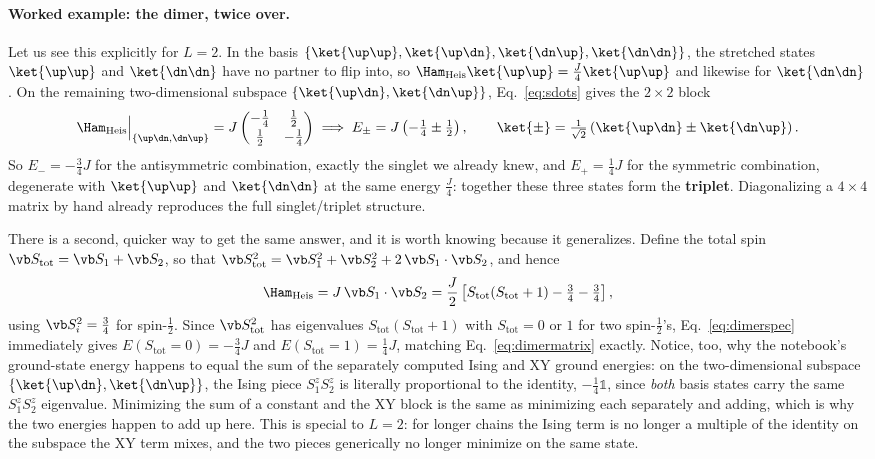\documentclass[all_sessions.tex]{subfiles}
\begin{document}
\paragraph{Worked example: the dimer, twice over.} Let us see this explicitly for $L=2$. In the basis
$\{\ket{\up\up},\ket{\up\dn},\ket{\dn\up},\ket{\dn\dn}\}$, the stretched states $\ket{\up\up}$ and
$\ket{\dn\dn}$ have no partner to flip into, so $\Ham_{\mathrm{Heis}}\ket{\up\up}=\tfrac{J}{4}\ket{\up\up}$
and likewise for $\ket{\dn\dn}$. On the remaining two-dimensional subspace $\{\ket{\up\dn},\ket{\dn\up}\}$,
Eq.~\eqref{eq:sdots} gives the $2\times2$ block
\begin{equation}
  \Ham_{\mathrm{Heis}}\Big|_{\{\up\dn,\dn\up\}} = J\begin{pmatrix} -\tfrac14 & \tfrac12 \\[2pt]
    \tfrac12 & -\tfrac14 \end{pmatrix}
  \;\Longrightarrow\;
  E_\pm = J\left(-\tfrac14\pm\tfrac12\right), \qquad
  \ket{\pm} = \tfrac{1}{\sqrt2}\left(\ket{\up\dn}\pm\ket{\dn\up}\right).
  \label{eq:dimermatrix}
\end{equation}
So $E_-=-\tfrac34 J$ for the antisymmetric combination, exactly the singlet we already knew, and
$E_+=\tfrac14 J$ for the symmetric combination, degenerate with $\ket{\up\up}$ and $\ket{\dn\dn}$ at the
same energy $\tfrac{J}{4}$: together these three states form the \textbf{triplet}. Diagonalizing a
$4\times4$ matrix by hand already reproduces the full singlet/triplet structure.

There is a second, quicker way to get the same answer, and it is worth knowing because it generalizes.
Define the total spin $\vb S_{\mathrm{tot}} = \vb S_1+\vb S_2$, so that
$\vb S_{\mathrm{tot}}^2 = \vb S_1^2+\vb S_2^2+2\,\vb S_1\cdot\vb S_2$, and hence
\begin{equation}
  \Ham_{\mathrm{Heis}} = J\,\vb S_1\cdot\vb S_2
    = \frac{J}{2}\left[S_{\mathrm{tot}}(S_{\mathrm{tot}}+1) - \tfrac34 - \tfrac34\right],
  \label{eq:dimerspec}
\end{equation}
using $\vb S_i^2=\tfrac34$ for spin-$\tfrac12$. Since $\vb S_{\mathrm{tot}}^2$ has eigenvalues
$S_{\mathrm{tot}}(S_{\mathrm{tot}}+1)$ with $S_{\mathrm{tot}}=0$ or $1$ for two spin-$\tfrac12$'s,
Eq.~\eqref{eq:dimerspec} immediately gives $E(S_{\mathrm{tot}}=0)=-\tfrac34J$ and
$E(S_{\mathrm{tot}}=1)=\tfrac14J$, matching Eq.~\eqref{eq:dimermatrix} exactly. Notice, too, why the
notebook's ground-state energy happens to equal the sum of the separately computed Ising and XY ground
energies: on the two-dimensional subspace $\{\ket{\up\dn},\ket{\dn\up}\}$, the Ising piece $S_1^zS_2^z$ is
literally proportional to the identity, $-\tfrac14\mathbb{1}$, since \emph{both} basis states carry the
same $S_1^zS_2^z$ eigenvalue. Minimizing the sum of a constant and the XY block is the same as minimizing
each separately and adding, which is why the two energies happen to add up here. This is special to
$L=2$: for longer chains the Ising term is no longer a multiple of the identity on the subspace the XY
term mixes, and the two pieces generically no longer minimize on the same state.
\end{document}
